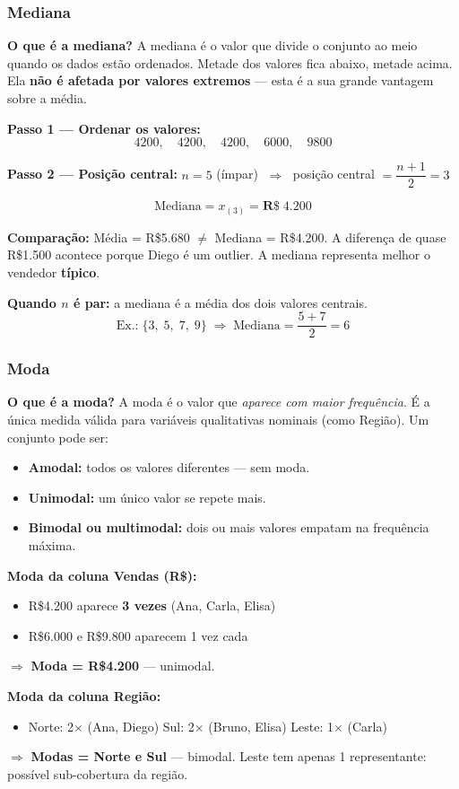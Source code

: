 \subsubsection*{Mediana}

\begin{SolvedBox}
\textbf{O que é a mediana?} A mediana é o valor que divide o conjunto ao
meio quando os dados estão ordenados. Metade dos valores fica abaixo, metade
acima. Ela \textbf{não é afetada por valores extremos} — esta é a sua grande
vantagem sobre a média.

\textbf{Passo 1 — Ordenar os valores:}
\[
4200,\quad 4200,\quad 4200,\quad 6000,\quad 9800
\]

\textbf{Passo 2 — Posição central:}
$n = 5$ (ímpar) $\;\Rightarrow\;$ posição central $= \dfrac{n+1}{2} = 3$

\[
\text{Mediana} = x_{(3)} = \mathbf{R\$\;4.200}
\]

\textbf{Comparação:} Média = R\$5.680 $\neq$ Mediana = R\$4.200. A diferença
de quase R\$1.500 acontece porque Diego é um outlier. A mediana representa
melhor o vendedor \textbf{típico}.

\medskip
\textbf{Quando $n$ é par:} a mediana é a média dos dois valores centrais.
\[
\text{Ex.:}\;\{3,\;5,\;7,\;9\}
\;\Rightarrow\;
\text{Mediana} = \frac{5+7}{2} = 6
\]
\end{SolvedBox}

\subsubsection*{Moda}

\begin{SolvedBox}
\textbf{O que é a moda?} A moda é o valor que \emph{aparece com maior
frequência}. É a única medida válida para variáveis qualitativas nominais
(como Região). Um conjunto pode ser:
\begin{itemize}
  \item \textbf{Amodal:} todos os valores diferentes — sem moda.
  \item \textbf{Unimodal:} um único valor se repete mais.
  \item \textbf{Bimodal ou multimodal:} dois ou mais valores empatam na
  frequência máxima.
\end{itemize}

\textbf{Moda da coluna Vendas (R\$):}
\begin{itemize}
  \item R\$4.200 aparece \textbf{3 vezes} (Ana, Carla, Elisa)
  \item R\$6.000 e R\$9.800 aparecem 1 vez cada
\end{itemize}
$\Rightarrow$ \textbf{Moda = R\$4.200} — unimodal.

\textbf{Moda da coluna Região:}
\begin{itemize}
  \item Norte: 2$\times$ (Ana, Diego) \quad Sul: 2$\times$ (Bruno, Elisa) \quad Leste: 1$\times$ (Carla)
\end{itemize}
$\Rightarrow$ \textbf{Modas = Norte e Sul} — bimodal. Leste tem apenas
1 representante: possível sub-cobertura da região.
\end{SolvedBox}


